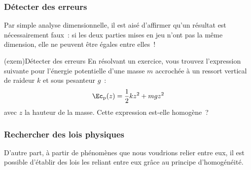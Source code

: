 \documentclass[../main/main.tex]{subfiles}
\begin{document}
\subsubsection{Détecter des erreurs}

Par simple analyse dimensionnelle, il est aisé d'affirmer qu'un résultat est
nécessairement faux~: si les deux parties mises en jeu n'ont pas la même
dimension, elle ne peuvent être égales entre elles~!

\begin{tcb}(exem){Détecter des erreurs}
	En résolvant un exercice, vous trouvez l'expression suivante pour l'énergie
	potentielle d'une masse $m$ accrochée à un ressort vertical de raideur $k$
	et sous pesanteur $g$~:
	\[\Ec_{\rm p} (z) = \frac{1}{2}kz^2 + mgz^2\]
	avec $z$ la hauteur de la masse. Cette expression est-elle homogène~?
	\tcblower
	\vspace*{-9pt}
	\begin{isd}[lefthand ratio=.4]
		\tcblower
	\end{isd}
	\vspace*{-20pt}
\end{tcb}

\subsubsection{Rechercher des lois physiques}
D'autre part, à partir de phénomènes que nous voudrions relier entre eux, il est
possible d'établir des lois les reliant entre eux grâce au principe
d'homogénéité.
\end{document}
